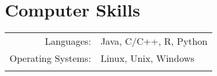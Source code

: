 \documentclass[a4paper,10pt]{article}
\begin{document}
\section{Computer Skills}
\begin{tabular}{rl}
 Languages:& Java, C/C++, R, Python\\
Operating Systems:& Linux, Unix, Windows\\&\\
\end{tabular}

\end{document}
